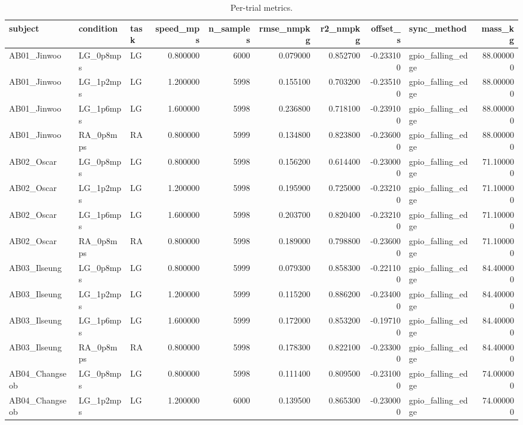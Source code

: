 \begin{table}
\caption{Per-trial metrics.}
\label{tab:table2_per_trial}
\begin{tabular}{lllrrrrrlr}
\toprule
subject & condition & task & speed\_mps & n\_samples & rmse\_nmpkg & r2\_nmpkg & offset\_s & sync\_method & mass\_kg \\
\midrule
AB01\_Jinwoo & LG\_0p8mps & LG & 0.800000 & 6000 & 0.079000 & 0.852700 & -0.233100 & gpio\_falling\_edge & 88.000000 \\
AB01\_Jinwoo & LG\_1p2mps & LG & 1.200000 & 5998 & 0.155100 & 0.703200 & -0.235100 & gpio\_falling\_edge & 88.000000 \\
AB01\_Jinwoo & LG\_1p6mps & LG & 1.600000 & 5998 & 0.236800 & 0.718100 & -0.239100 & gpio\_falling\_edge & 88.000000 \\
AB01\_Jinwoo & RA\_0p8mps & RA & 0.800000 & 5999 & 0.134800 & 0.823800 & -0.236000 & gpio\_falling\_edge & 88.000000 \\
AB02\_Oscar & LG\_0p8mps & LG & 0.800000 & 5998 & 0.156200 & 0.614400 & -0.230000 & gpio\_falling\_edge & 71.100000 \\
AB02\_Oscar & LG\_1p2mps & LG & 1.200000 & 5998 & 0.195900 & 0.725000 & -0.232100 & gpio\_falling\_edge & 71.100000 \\
AB02\_Oscar & LG\_1p6mps & LG & 1.600000 & 5998 & 0.203700 & 0.820400 & -0.232100 & gpio\_falling\_edge & 71.100000 \\
AB02\_Oscar & RA\_0p8mps & RA & 0.800000 & 5998 & 0.189000 & 0.798800 & -0.236000 & gpio\_falling\_edge & 71.100000 \\
AB03\_Ilseung & LG\_0p8mps & LG & 0.800000 & 5999 & 0.079300 & 0.858300 & -0.221100 & gpio\_falling\_edge & 84.400000 \\
AB03\_Ilseung & LG\_1p2mps & LG & 1.200000 & 5999 & 0.115200 & 0.886200 & -0.234000 & gpio\_falling\_edge & 84.400000 \\
AB03\_Ilseung & LG\_1p6mps & LG & 1.600000 & 5999 & 0.172000 & 0.853200 & -0.197100 & gpio\_falling\_edge & 84.400000 \\
AB03\_Ilseung & RA\_0p8mps & RA & 0.800000 & 5998 & 0.178300 & 0.822100 & -0.233000 & gpio\_falling\_edge & 84.400000 \\
AB04\_Changseob & LG\_0p8mps & LG & 0.800000 & 5998 & 0.111400 & 0.809500 & -0.231000 & gpio\_falling\_edge & 74.000000 \\
AB04\_Changseob & LG\_1p2mps & LG & 1.200000 & 6000 & 0.139500 & 0.865300 & -0.230000 & gpio\_falling\_edge & 74.000000 \\

\end{tabular}
\end{table}
